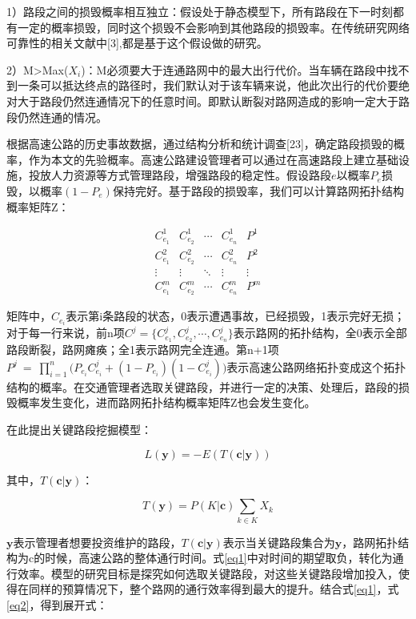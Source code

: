 			1）路段之间的损毁概率相互独立：假设处于静态模型下，所有路段在下一时刻都有一定的概率损毁，同时这个损毁不会影响到其他路段的损毁率。在传统研究网络可靠性的相关文献中[3],都是基于这个假设做的研究。

			2）M>Max($X_i$)：M必须要大于连通路网中的最大出行代价。当车辆在路段中找不到一条可以抵达终点的路径时，我们默认对于该车辆来说，他此次出行的代价要绝对大于路段仍然连通情况下的任意时间。即默认断裂对路网造成的影响一定大于路段仍然连通的情况。


			根据高速公路的历史事故数据，通过结构分析和统计调查[23]，确定路段损毁的概率，作为本文的先验概率。高速公路建设管理者可以通过在高速路段上建立基础设施，投放人力资源等方式管理路段，增强路段的稳定性。假设路段$e$以概率$P_e$损毁，以概率$(1-P_e)$保持完好。基于路段的损毁率，我们可以计算路网拓扑结构概率矩阵Z：

		\[\begin{array}{*{20}{c}}
		{C_{{e_1}}^1}&{C_{{e_2}}^1}& \cdots &{C_{{e_n}}^1}&{{P^1}}\\
		{C_{{e_1}}^2}&{C_{{e_2}}^2}& \cdots &{C_{{e_n}}^2}&{{P^2}}\\
		 \vdots & \vdots & \ddots & \vdots & \vdots \\
		{C_{{e_1}}^m}&{C_{{e_2}}^m}& \cdots &{C_{{e_n}}^m}&{{P^m}}
		\end{array}\]


		矩阵中，$C_{{e_i}}$表示第i条路段的状态，0表示遭遇事故，已经损毁，1表示完好无损；对于每一行来说，前n项$C^j = \{{C_{{e_1}}^j},{C_{{e_2}}^j},\cdots,{C_{{e_n}}^j}\}$表示路网的拓扑结构，全0表示全部路段断裂，路网瘫痪；全1表示路网完全连通。第n+1项$P^j \ = \ \prod\limits_{i = 1}^n {({P_{{e_i}}}C_{{e_i}}^j + (1 - {P_{{e_i}}})} (1 - C_{{e_i}}^j))$表示高速公路网络拓扑变成这个拓扑结构的概率。在交通管理者选取关键路段，并进行一定的决策、处理后，路段的损毁概率发生变化，进而路网拓扑结构概率矩阵Z也会发生变化。

		在此提出关键路段挖掘模型：

		\begin{equation}
		L(\bm{y}) = -E(T(\bm{c}|\bm{y} ))
		\label{eq1}
		\end{equation}

		其中，$T(\bm{c}|\bm{y} )$：

		\begin{equation}
		T(\bm{y} ) = P(K|\bm{c})\sum\limits_{k \in K} {{X_k}} 
		\label{eq2}
		\end{equation}

		$\bm{y} $表示管理者想要投资维护的路段，$T(\bm{c}|\bm{y} )$表示当关键路段集合为$\bm{y}$，路网拓扑结构为c的时候，高速公路的整体通行时间。式\ref{eq1}中对时间的期望取负，转化为通行效率。模型的研究目标是探究如何选取关键路段，对这些关键路段增加投入，使得在同样的预算情况下，整个路网的通行效率得到最大的提升。结合式\ref{eq1}，式\ref{eq2}，得到展开式：

